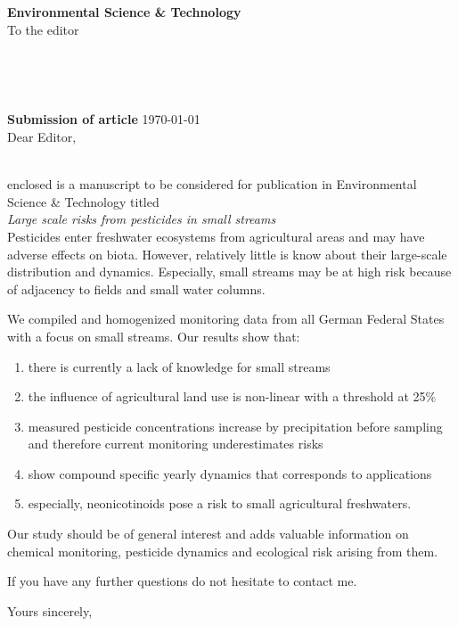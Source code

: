 \documentclass[11pt,a4paper]{letter} %
\def\opening#1{
\thispagestyle{empty}
{\centering\fromaddress \vspace{0.5in} \\} 
{\raggedright \toname \\ \toaddress \par} %
\vspace{3em}
\noindent
\textbf{Submission of article} \hspace*{\fill}\today \\[2em]
\vspace{0.6in} %
\noindent #1 %
}
\begin{document}

\begin{letter}
{
\textbf{Environmental Science \& Technology} \\
\vspace{1em}
To the editor
}

\setlength\parindent{0pt}




\opening{Dear Editor,}
\vspace{-2em}\\
enclosed is a manuscript to be considered for publication in Environmental Science \& Technology titled \\[-1em]

\emph{Large scale risks from pesticides in small streams}\\[-1em]

Pesticides enter freshwater ecosystems from agricultural areas and may have adverse effects on biota.
However, relatively little is know about their large-scale distribution and dynamics.
Especially, small streams may be at high risk because of adjacency to fields and small water columns. 

We compiled and homogenized monitoring data from all German Federal States with a focus on small streams. 
Our results show that:
\begin{enumerate} 
\item there is currently a lack of knowledge for small streams
\item the influence of agricultural land use is non-linear with a threshold at 25\%
\item measured pesticide concentrations increase by precipitation before sampling and therefore current monitoring underestimates risks
\item show compound specific yearly dynamics that corresponds to applications
\item especially, neonicotinoids pose a risk to small agricultural freshwaters.
\end{enumerate}

Our study should be of general interest and adds valuable information on chemical monitoring, pesticide dynamics and ecological risk arising from them.


If you have any further questions do not hesitate to contact me.

\closing{Yours sincerely, }


\end{letter}
\end{document}
